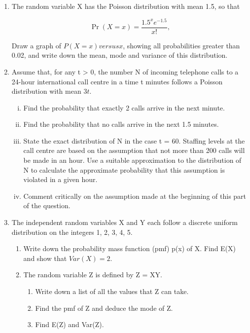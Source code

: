 \documentclass[a4paper,12pt]{article}
\begin{document}
\begin{enumerate}
\item The random variable X has the Poisson distribution with mean 1.5, so that


\[ {\displaystyle \Pr(X=x)={\frac {1.5 ^{x}e^{-1.5 }}{x!}},} \]


Draw a graph of $P(X = x) versus x$, showing all probabilities greater than 0.02, and write down the mean, mode and variance of this distribution.

\item Assume that, for any t > 0, the number N of incoming telephone calls to a 24-hour international call centre in a time t minutes follows a Poisson distribution with mean $3t$.
\begin{enumerate}[(i)]
\item Find the probability that exactly 2 calls arrive in the next minute.

\item Find the probability that no calls arrive in the next 1.5 minutes.

\item State the exact distribution of N in the case t = 60. Staffing levels at the call centre are based on the assumption that not more than 200 calls will be made in an hour. Use a suitable approximation to the distribution of N to calculate the approximate probability that this assumption is violated in a given hour.
\item Comment critically on the assumption made at the beginning of this part of the question.
\end{enumerate}
\item The independent random variables X and Y each follow a discrete uniform distribution
on the integers 1, 2, 3, 4, 5.
\begin{enumerate}
\item Write down the probability mass function (pmf) p(x) of X. Find E(X) and show
that $Var(X) = 2$.
\item The random variable Z is defined by Z = XY.
\begin{enumerate}[(i]
\item Write down a list of all the values that Z can take.
\item Find the pmf of Z and deduce the mode of Z.
\item Find E(Z) and Var(Z).
\end{enumerate}
\end{enumerate}




\end{enumerate}
\end{document}
